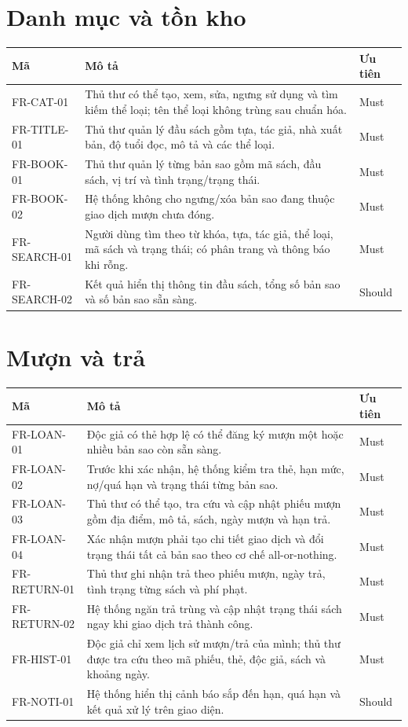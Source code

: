 \documentclass[12pt,a4paper,oneside]{report}
\begin{document}
\section{Danh mục và tồn kho}
\begin{longtable}{L{2.2cm}L{9.9cm}L{2.2cm}}
\toprule Mã & Mô tả & Ưu tiên\\\midrule\endhead
FR-CAT-01 & Thủ thư có thể tạo, xem, sửa, ngưng sử dụng và tìm kiếm thể loại; tên thể loại không trùng sau chuẩn hóa. & Must\\
FR-TITLE-01 & Thủ thư quản lý đầu sách gồm tựa, tác giả, nhà xuất bản, độ tuổi đọc, mô tả và các thể loại. & Must\\
FR-BOOK-01 & Thủ thư quản lý từng bản sao gồm mã sách, đầu sách, vị trí và tình trạng/trạng thái. & Must\\
FR-BOOK-02 & Hệ thống không cho ngưng/xóa bản sao đang thuộc giao dịch mượn chưa đóng. & Must\\
FR-SEARCH-01 & Người dùng tìm theo từ khóa, tựa, tác giả, thể loại, mã sách và trạng thái; có phân trang và thông báo khi rỗng. & Must\\
FR-SEARCH-02 & Kết quả hiển thị thông tin đầu sách, tổng số bản sao và số bản sao sẵn sàng. & Should\\
\bottomrule
\end{longtable}

\section{Mượn và trả}
\begin{longtable}{L{2.2cm}L{9.9cm}L{2.2cm}}
\toprule Mã & Mô tả & Ưu tiên\\\midrule\endhead
FR-LOAN-01 & Độc giả có thẻ hợp lệ có thể đăng ký mượn một hoặc nhiều bản sao còn sẵn sàng. & Must\\
FR-LOAN-02 & Trước khi xác nhận, hệ thống kiểm tra thẻ, hạn mức, nợ/quá hạn và trạng thái từng bản sao. & Must\\
FR-LOAN-03 & Thủ thư có thể tạo, tra cứu và cập nhật phiếu mượn gồm địa điểm, mô tả, sách, ngày mượn và hạn trả. & Must\\
FR-LOAN-04 & Xác nhận mượn phải tạo chi tiết giao dịch và đổi trạng thái tất cả bản sao theo cơ chế all-or-nothing. & Must\\
FR-RETURN-01 & Thủ thư ghi nhận trả theo phiếu mượn, ngày trả, tình trạng từng sách và phí phạt. & Must\\
FR-RETURN-02 & Hệ thống ngăn trả trùng và cập nhật trạng thái sách ngay khi giao dịch trả thành công. & Must\\
FR-HIST-01 & Độc giả chỉ xem lịch sử mượn/trả của mình; thủ thư được tra cứu theo mã phiếu, thẻ, độc giả, sách và khoảng ngày. & Must\\
FR-NOTI-01 & Hệ thống hiển thị cảnh báo sắp đến hạn, quá hạn và kết quả xử lý trên giao diện. & Should\\
\bottomrule
\end{longtable}
\end{document}
